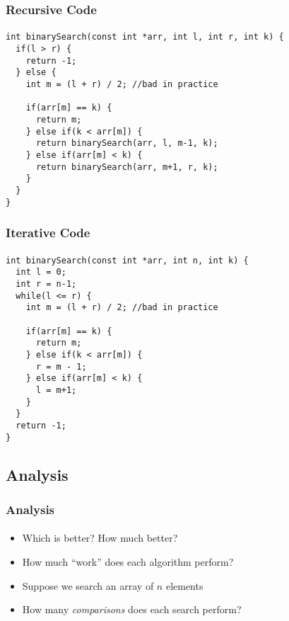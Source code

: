 \documentclass[]{beamer}
\begin{document}
\begin{frame}[fragile]
  \frametitle{Recursive Code}
  \framesubtitle{}

\begin{verbatim}
int binarySearch(const int *arr, int l, int r, int k) {
  if(l > r) {
    return -1;
  } else {
    int m = (l + r) / 2; //bad in practice
    
    if(arr[m] == k) {
      return m;
    } else if(k < arr[m]) {
      return binarySearch(arr, l, m-1, k);
    } else if(arr[m] < k) {
      return binarySearch(arr, m+1, r, k);
    }
  }
}
\end{verbatim}

\end{frame}

\begin{frame}[fragile]
  \frametitle{Iterative Code}
  \framesubtitle{}

\begin{verbatim}
int binarySearch(const int *arr, int n, int k) {
  int l = 0;
  int r = n-1;
  while(l <= r) {
    int m = (l + r) / 2; //bad in practice
    
    if(arr[m] == k) {
      return m;
    } else if(k < arr[m]) {
      r = m - 1;
    } else if(arr[m] < k) {
      l = m+1;
    }
  }
  return -1;
}
\end{verbatim}

\end{frame}

\subsection{Analysis}

\begin{frame}[fragile]
  \frametitle{Analysis}
  \framesubtitle{}


\begin{itemize}[<+->]
  \item Which is better?  How much better?
  \item How much ``work'' does each algorithm perform?
  \item Suppose we search an array of $n$ elements
  \item How many \emph{comparisons} does each search perform?
\end{itemize}

\end{frame}
\end{document}
